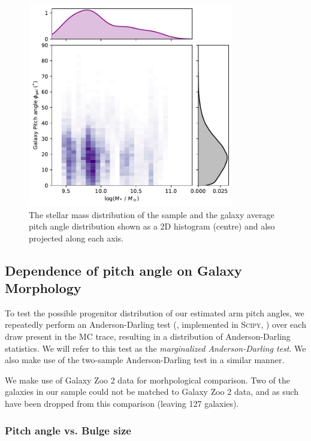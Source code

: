 \begin{figure}
  \includegraphics[width=9cm]{plots/stellar_mass_phigal_distribution.pdf}
  \caption{The stellar mass distribution of the sample and the galaxy average pitch angle distribution shown as a 2D histogram (centre) and also projected along each axis. }
  \label{fig:stellar-mass-phigal}
\end{figure}


\subsection{Dependence of pitch angle on Galaxy Morphology}
\label{section:morphology-comparison}

To test the possible progenitor distribution of our estimated arm pitch angles, we repeatedly perform an Anderson-Darling test (\citealt{10.2307/2286009}, implemented in \textsc{Scipy}, \citealt{scipy-paper}) over each draw present in the MC trace, resulting in a distribution of Anderson-Darling statistics. We will refer to this test as the \textit{marginalized Anderson-Darling test}. We also make use of the two-sample Anderson-Darling \citep{doi:10.1080/01621459.1987.10478517} test in a similar manner.

We make use of Galaxy Zoo 2 data for morhpological comparison. Two of the galaxies in our sample could not be matched to Galaxy Zoo 2 data, and as such have been dropped from this comparison (leaving 127 galaxies).

\subsubsection{Pitch angle vs. Bulge size}
\label{section:morphology-comparison-bulge}

